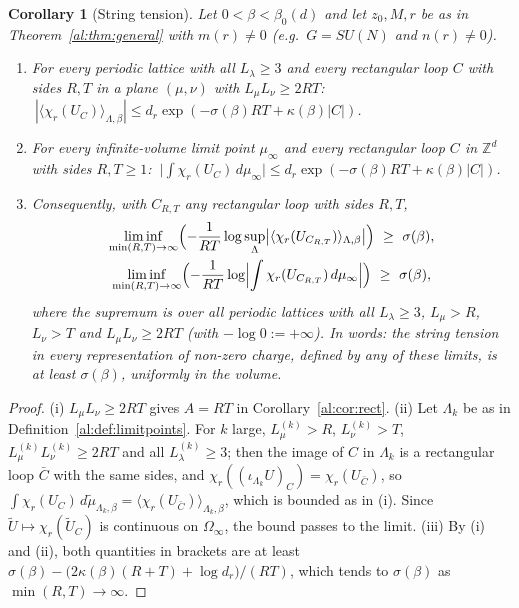 \documentclass[11pt,a4paper]{article}
\newtheorem{corollary}[theorem]{Corollary}
\theoremstyle{definition}
\theoremstyle{remark}
\newcommand{\Z}{\mathbb{Z}}
\begin{document}
\begin{corollary}[String tension]\label{al:cor:tension}
Let $0<\beta<\beta_0(d)$ and let $z_0,M,r$ be as in Theorem~\ref{al:thm:general} with $m(r)\neq0$ (e.g.\ $G=SU(N)$ and
$n(r)\neq0$).
\begin{enumerate}[label=(\roman*)]
\item For every periodic lattice with all $L_\lambda\ge3$ and every rectangular loop $C$ with sides $R,T$ in a plane
$(\mu,\nu)$ with $L_\mu L_\nu\ge2RT$: $\ |\langle\chi_r(U_C)\rangle_{\Lambda,\beta}|\le d_r\exp(-\sigma(\beta)RT+\kappa(\beta)|C|)$.
\item For every infinite-volume limit point $\mu_\infty$ and every rectangular loop $C$ in $\Z^d$ with sides $R,T\ge1$:
$\ \bigl|\int\chi_r(U_C)\,d\mu_\infty\bigr|\le d_r\exp(-\sigma(\beta)RT+\kappa(\beta)|C|)$.
\item Consequently, with $C_{R,T}$ any rectangular loop with sides $R,T$,
\begin{gather*}
\liminf_{\min(R,T)\to\infty}\Bigl(-\frac1{RT}\log\sup_\Lambda\bigl|\langle\chi_r(U_{C_{R,T}})\rangle_{\Lambda,\beta}\bigr|\Bigr)\ \ge\ \sigma(\beta),\\
\liminf_{\min(R,T)\to\infty}\Bigl(-\frac1{RT}\log\Bigl|\int\chi_r(U_{C_{R,T}})\,d\mu_\infty\Bigr|\Bigr)\ \ge\ \sigma(\beta),
\end{gather*}
where the supremum is over all periodic lattices with all $L_\lambda\ge3$, $L_\mu>R$, $L_\nu>T$ and $L_\mu L_\nu\ge2RT$
(with $-\log0:=+\infty$). In words: the string tension in every representation of non-zero charge, defined by any of these
limits, is at least $\sigma(\beta)$, uniformly in the volume.
\end{enumerate}
\end{corollary}

\begin{proof}
(i) $L_\mu L_\nu\ge2RT$ gives $A=RT$ in Corollary~\ref{al:cor:rect}. (ii) Let $\Lambda_k$ be as in
Definition~\ref{al:def:limitpoints}. For $k$ large, $L^{(k)}_\mu>R$, $L^{(k)}_\nu>T$, $L^{(k)}_\mu L^{(k)}_\nu\ge2RT$ and all
$L^{(k)}_\lambda\ge3$; then the image of $C$ in $\Lambda_k$ is a rectangular loop $\bar C$ with the same sides, and
$\chi_r((\iota_{\Lambda_k}U)_C)=\chi_r(U_{\bar C})$, so $\int\chi_r(U_C)\,d\tilde\mu_{\Lambda_k,\beta}=\langle\chi_r(U_{\bar C})\rangle_{\Lambda_k,\beta}$,
which is bounded as in (i). Since $\tilde U\mapsto\chi_r(\tilde U_C)$ is continuous on $\Omega_\infty$, the bound passes to
the limit. (iii) By (i) and (ii), both quantities in brackets are at least
$\sigma(\beta)-\bigl(2\kappa(\beta)(R+T)+\log d_r\bigr)/(RT)$, which tends to $\sigma(\beta)$ as $\min(R,T)\to\infty$.
\end{proof}
\end{document}
